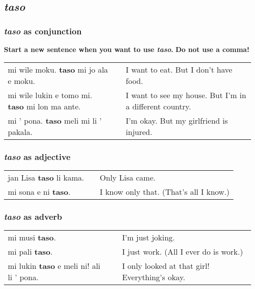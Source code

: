 \subsection*{\textit{taso}}
\subsubsection*{\textit{taso} as conjunction}
%
\textbf{Start a new sentence when you want to use \textit{taso}.} 
\textbf{Do not use a comma!} 

\begin{supertabular}{p{5,5cm}|ll}
mi wile moku. \textbf{taso} mi jo ala e moku. && I want to eat. But I don't have food. \\ 
mi wile lukin e tomo mi. \textbf{taso} mi lon ma ante. && I want to see my house. But I'm in a different country. \\ 
mi ' pona. \textbf{taso} meli mi li ' pakala. && I'm okay. But my girlfriend is injured. \\
\end{supertabular} 
%
\subsubsection*{\textit{taso} as adjective}
%
\begin{supertabular}{p{5,5cm}|ll}
jan Lisa \textbf{taso} li kama. && Only Lisa came. \\
mi sona e ni \textbf{taso}. && I know only that. (That's all I know.) \\
\end{supertabular} 
%
\subsubsection*{\textit{taso} as adverb}
%
\begin{supertabular}{p{5,5cm}|ll}
mi musi \textbf{taso}. && I'm just joking. \\
mi pali \textbf{taso}. && I just work. (All I ever do is work.) \\ 
mi lukin \textbf{taso} e meli ni! ali li ' pona. && I only looked at that girl! Everything's okay. \\
\end{supertabular} 
%
